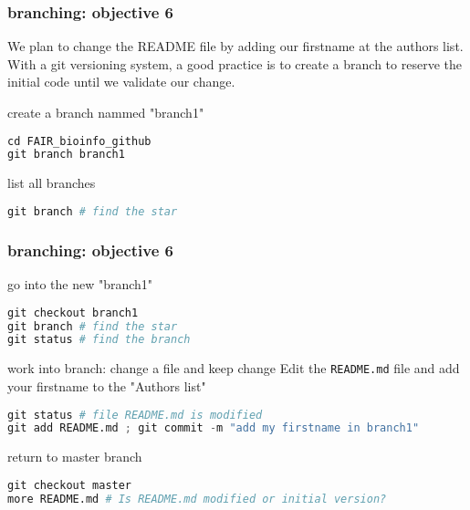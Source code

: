 \begin{frame}[containsverbatim]
\frametitle{ branching: objective 6}
\begin{exampleblock}{}
We plan to change the README file by adding our firstname at the authors list. With a git versioning system, a good practice is to create a branch to reserve the initial code until we validate our change.
\end{exampleblock}
\begin{exampleblock}{create a branch nammed "branch1"}
\begin{lstlisting}[language=python]
cd FAIR_bioinfo_github
git branch branch1
\end{lstlisting}
\end{exampleblock}
\begin{exampleblock}{list all branches}
\begin{lstlisting}[language=python]
git branch # find the star
\end{lstlisting}
\end{exampleblock}
\end{frame}
\begin{frame}[containsverbatim]
\frametitle{ branching: objective 6}
\begin{exampleblock}{go into the new "branch1"}
\begin{lstlisting}[language=python]
git checkout branch1
git branch # find the star
git status # find the branch
\end{lstlisting}
\end{exampleblock}
\begin{exampleblock}{work into branch: change a file and keep change}
Edit the \verb|README.md| file and add your firstname to the "Authors list"
\begin{lstlisting}[language=python]
git status # file README.md is modified
git add README.md ; git commit -m "add my firstname in branch1"
\end{lstlisting}
\end{exampleblock}
\begin{exampleblock}{return to master branch}
\begin{lstlisting}[language=python]
git checkout master
more README.md # Is README.md modified or initial version?
\end{lstlisting}
\end{exampleblock}
\end{frame}

